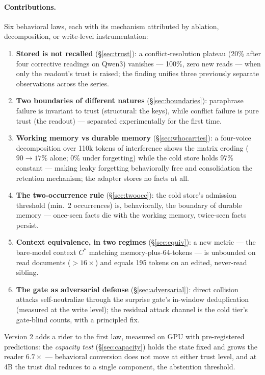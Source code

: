 \documentclass[11pt]{article}
\begin{document}
\paragraph{Contributions.} Six behavioral laws, each with its mechanism attributed by ablation, decomposition, or write-level instrumentation:
\begin{enumerate}[leftmargin=1.5em,itemsep=2pt]
\item \textbf{Stored is not recalled} (\S\ref{sec:trust}): a conflict-resolution plateau (20\% after four corrective readings on Qwen3) vanishes --- 100\%, zero new reads --- when only the readout's trust is raised; the finding unifies three previously separate observations across the series.
\item \textbf{Two boundaries of different natures} (\S\ref{sec:boundaries}): paraphrase failure is invariant to trust (structural: the keys), while conflict failure is pure trust (the readout) --- separated experimentally for the first time.
\item \textbf{Working memory vs durable memory} (\S\ref{sec:whocarries}): a four-voice decomposition over 110k tokens of interference shows the matrix eroding ($90 \to 17\%$ alone; $0\%$ under forgetting) while the cold store holds 97\% constant --- making leaky forgetting behaviorally free and consolidation the retention mechanism; the adapter stores no facts at all.
\item \textbf{The two-occurrence rule} (\S\ref{sec:twoocc}): the cold store's admission threshold (min.\ 2 occurrences) is, behaviorally, the boundary of durable memory --- once-seen facts die with the working memory, twice-seen facts persist.
\item \textbf{Context equivalence, in two regimes} (\S\ref{sec:equiv}): a new metric --- the bare-model context $C^{*}$ matching memory-plus-64-tokens --- is unbounded on read documents ($>16\times$) and equals 195 tokens on an edited, never-read sibling.
\item \textbf{The gate as adversarial defense} (\S\ref{sec:adversarial}): direct collision attacks self-neutralize through the surprise gate's in-window deduplication (measured at the write level); the residual attack channel is the cold tier's gate-blind counts, with a principled fix.
\end{enumerate}

Version 2 adds a rider to the first law, measured on GPU with pre-registered predictions: the \emph{capacity test} (\S\ref{sec:capacity}) holds the state fixed and grows the reader $6.7\times$ --- behavioral conversion does not move at either trust level, and at 4B the trust dial reduces to a single component, the abstention threshold.
\end{document}
